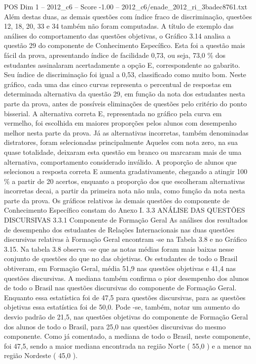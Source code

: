 \begin{textsample}{POS Dim 1 – 2012\_c6 – Score -1.00 – 2012\_c6/enade\_2012\_ri\_3badec8761.txt}
Além destas duas, as demais questões com índice fraco de discriminação, questões 12, 18, 20, 33 e 34 também não foram computadas.
A título de exemplo das análises do comportamento das questões objetivas, o Gráfico 3.14 analisa a questão 29 do componente de Conhecimento Específico.
Esta foi a questão mais fácil da prova, apresentando índice de facilidade 0,73, ou seja, 73,0 \% dos estudantes assinalaram acertadamente a opção E, correspondente ao gabarito.
Seu índice de discriminação foi igual a 0,53, classificado como muito bom.
Neste gráfico, cada uma das cinco curvas representa o percentual de respostas em determinada alternativa da questão 29, em função da nota dos estudantes nesta parte da prova, antes de possíveis eliminações de questões pelo critério do ponto bisserial.
A alternativa correta E, representada no gráfico pela curva em vermelho, foi escolhida em maiores proporções pelos alunos com desempenho melhor nesta parte da prova.
Já as alternativas incorretas, também denominadas distratores, foram selecionadas principalmente Aqueles com nota zero, na sua quase totalidade, deixaram esta questão em branco ou marcaram mais de uma alternativa, comportamento considerado inválido.
A proporção de alunos que selecionou a resposta correta E aumenta gradativamente, chegando a atingir 100 \% a partir de 20 acertos, enquanto a proporção dos que escolheram alternativas incorretas decai, a partir da primeira nota não nula, como função da nota nesta parte da prova.
Os gráficos relativos às demais questões do componente de Conhecimento Específico constam do Anexo I. 3.3 ANÁLISE DAS QUESTÕES DISCURSIVAS 3.3.1 Componente de Formação Geral As análises dos resultados de desempenho dos estudantes de Relações Internacionais nas duas questões discursivas relativas à Formação Geral encontram -se na Tabela 3.8 e no Gráfico 3.15.
Na tabela 3.8 observa -se que as notas médias foram mais baixas nesse conjunto de questões do que no das objetivas.
Os estudantes de todo o Brasil obtiveram, em Formação Geral, média 51,9 nas questões objetivas e 41,4 nas questões discursivas.
A mediana também confirma o pior desempenho dos alunos de todo o Brasil nas questões discursivas do componente de Formação Geral.
Enquanto essa estatística foi de 47,5 para questões discursivas, para as questões objetivas essa estatística foi de 50,0.
Pode -se, também, notar um aumento do desvio padrão de 21,5, nas questões objetivas do componente de Formação Geral dos alunos de todo o Brasil, para 25,0 nas questões discursivas do mesmo componente.
Como já comentado, a mediana de todo o Brasil, neste componente, foi 47,5, sendo a maior mediana encontrada na região Norte ( 55,0 ) e a menor na região Nordeste ( 45,0 ).

\end{textsample}
